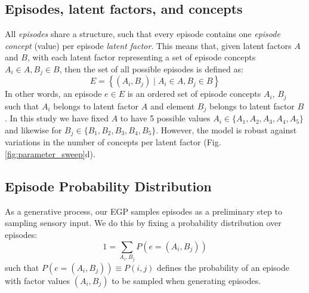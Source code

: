\documentclass{article}
\begin{document}
\subsection*{Episodes, latent factors, and concepts}
All \textit{episodes} share a structure, such that every episode contains one \textit{episode concept} (value) per episode \textit{latent factor}. This means that, given latent factors $A$ and $B$, with each latent factor representing a set of episode concepts $A_i\in A, B_j\in B$, then the set of all possible episodes is defined as:
\begin{equation}
    E = \left\{ (A_i, B_j) \mid A_i \in A, B_j \in B \right\}
\end{equation}
In other words, an episode $e\in E$ is an ordered set of episode concepts $A_i$, $B_j$ such that $A_i$ belongs to latent factor $A$ and element $B_j$ belongs to latent factor $B$. In this study we have fixed $A$ to have 5 possible values $A_i\in \{A_1, A_2, A_3, A_4, A_5\}$ and likewise for $B_j\in \{B_1, B_2, B_3, B_4, B_5\}$. However, the model is robust against variations in the number of concepts per latent factor (Fig. \ref{fig:parameter_sweep}d). 
\newline\newline
\subsection*{Episode Probability Distribution}
As a generative process, our EGP samples episodes as a preliminary step to sampling sensory input. We do this by fixing a probability distribution over episodes:
\begin{equation}
    1 = \sum_{A_i, B_j}P(e = (A_i, B_j)) 
\end{equation}
such that $P(e = (A_i, B_j)) \equiv P(i,j)$ defines the probability of an episode with factor values $(A_i, B_j)$ to be sampled when generating episodes.
\end{document}
